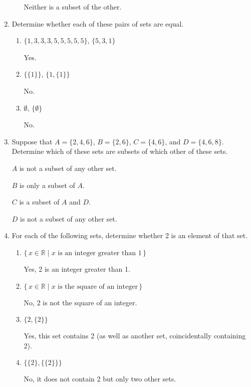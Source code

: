 \documentclass[11pt]{article}
\begin{document}
\begin{enumerate}[label=\textbf{\arabic*.}]
\begin{enumerate}[label=\textbf{\alph*)}]
		Neither is a subset of the other.
	\end{enumerate}

	\item Determine whether each of these pairs of sets are equal.
	
	\begin{enumerate}[label=\textbf{\alph*)}]
		\item $\{1, 3, 3, 3, 5, 5, 5, 5, 5\}$, $\{5, 3, 1\}$
		
		Yes.
		
		\item $\{\{1\}\}$, $\{1, \{1\}\}$
		
		No.
		
		\item $\emptyset$, $\{\emptyset\}$
		
		No.
	\end{enumerate}

	\pagebreak
	\item Suppose that $A = \{2, 4, 6\}$, $B = \{2, 6\}$, $C = \{4, 6\}$, and $D = \{4, 6, 8\}$. Determine which of these sets are subsets of which other of these sets.
	
	$A$ is not a subset of any other set.
	
	$B$ is only a subset of $A$.
	
	$C$ is a subset of $A$ and $D$.
	
	$D$ is not a subset of any other set.
	
	\item For each of the following sets, determine whether 2 is an element of that set.
	
	\begin{enumerate}[label=\textbf{\alph*)}]
		\item $\{\,x \in \mathbb{R} \mid x \text{ is an integer greater than } 1\,\}$
		
		Yes, 2 is an integer greater than 1.
		
		\item $\{\,x \in \mathbb{R} \mid x \text{ is the square of an integer}\,\}$
		
		No, 2 is not the square of an integer.
		
		\item $\{2, \{2\}\}$
		
		Yes, this set contains 2 (as well as another set, coincidentally containing 2).
		
		\item $\{\{2\}, \{\{2\}\}\}$
		
		No, it does not contain 2 but only two other sets.
		

\end{enumerate}
\end{enumerate}
\end{document}
